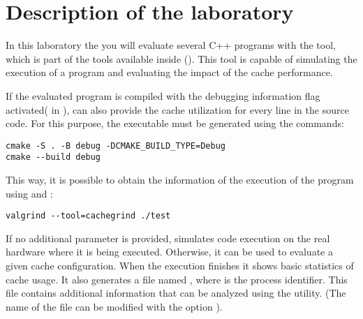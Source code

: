 \section{Description of the laboratory}

In this laboratory the you will evaluate several C++ programs  with
 the tool, which is part of the tools available inside
 (). This tool is
capable of simulating the execution of a program and evaluating the impact of
the cache performance. 

If the evaluated program is compiled with the debugging information flag
activated( in ),  can also
provide the cache utilization for every line in the source code. For this
purpose, the executable must be generated using the commands:

\begin{lstlisting}[style=terminal,aboveskip=1em,belowskip=1em]
cmake -S . -B debug -DCMAKE_BUILD_TYPE=Debug
cmake --build debug
\end{lstlisting}

\vspace{1em}

This way, it is possible to obtain the information of the execution of the
program using  and :

\begin{lstlisting}[style=terminal,aboveskip=1em,belowskip=1em]
valgrind --tool=cachegrind ./test
\end{lstlisting}

\vspace{1em}

If no additional parameter is provided,  simulates code
execution on the real hardware where it is being executed. Otherwise,
it can be used to evaluate a given cache configuration.
When the execution finishes it shows basic statistics of cache usage.
It also generates a file named ,
where  is the process identifier. 
This file contains additional information that can be analyzed using the 
 utility. 
(The name of the file can be modified with the option
).

